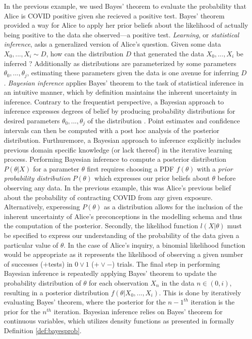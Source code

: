 \documentclass[
  12pt,
]{book}
\theoremstyle{definition}
\theoremstyle{definition}
\theoremstyle{definition}
\theoremstyle{remark}
\begin{document}
In the previous example, we used Bayes' theorem to evaluate the probability that Alice is COVID positive given she recieved a positive test.
Bayes' theorem provided a way for Alice to apply her prior beliefs about the likelihood of actually being positive to the data she observed---a positive test.
\emph{Learning}, or \emph{statistical inference}, asks a generalized version of Alice's question.
Given some data \(X_0,...,X_i \sim D\), how can the distribution \(D\) that generated the data \(X_0,...,X_i\) be inferred \citep[  6.1]{Wasserman2004}?
Additionally as distributions are parameterized by some parameters \(\theta_0, ..., \theta_j\), estimating these parameters given the data is one avenue for inferring \(D\).
\emph{Bayesian inference} applies Bayes' theorem to the task of statistical inference in an intuitive manner, which by definition maintains the inherent uncertainty in inference.
Contrary to the frequentist perspective, a Bayesian approach to inference expresses degrees of belief by producing probability distributions for desired parameters \(\theta_0, ..., \theta_j\) of the distribution \citep[ Sec 11.1]{Wasserman2004}.
Point estimates and confidence intervals can then be computed with a post hoc analysis of the posterior distribution.
Furthuremore, a Bayesian approach to inference explicitly includes previous domain specific knowledge (or lack thereof) in the iterative learning process.
Performing Bayesian inference to compute a posterior distribution \(P(\theta|X)\) for a parameter \(\theta\) first requires choosing a PDF \(f(\theta)\) with a \emph{prior probability distribution} \(P(\theta)\) which expresses our prior beliefs about \(\theta\) before observing any data.
In the previous example, this was Alice's previous belief about the probability of contracting COVID from any given exposure.
Alternatively, experessing \(P(\theta)\) as a distribution allows for the inclusion of the inherent uncertainty of Alice's preconceptions in the modelling schema and thus the computation of the posterior.
Secondly, the likelihod function \(l(X|\theta)\) must be specified to express our understanding of the probability of the data given a particular value of \(\theta\).
In the case of Alice's inquiry, a binomial likelihood function would be appropriate as it represents the likelihood of observing a given number of successes (\(+\)tests) in \(0 \lor 1\) (\(+ \lor -\)) trials.
The final step in performing Bayesian inference is repeatedly applying Bayes' theorem to update the probability distribution of \(\theta\) for each observation \(X_n\) in the data \(n \in (0,i)\), resulting in a posterior distribution \(f(\theta|X_0,...,X_i)\).
This is done by iteratively evaluating Bayes' theorem, where the posterior for the \(n-1^{th}\) iteration is the prior for the \(n^{th}\) iteration.
Bayesian inference relies on Bayes' theorem for continuous variables, which utilizes density functions as presented in formally Definition \ref{def:bayesprob}.
\end{document}
